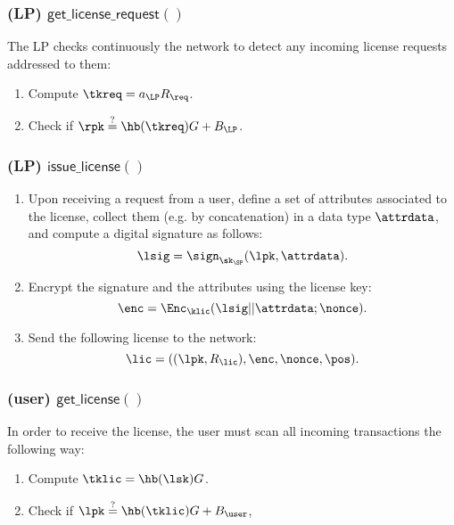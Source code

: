 \subsubsection{(\textbf{LP}) $\mathsf{get\_license\_request()}$}

The LP checks continuously the network to detect any incoming license requests addressed to them:

\begin{enumerate}
	\item Compute $\tkreq = a_{\LP}R_{\req}$.
	\item Check if $\rpk \stackrel{?}{=} \hb(\tkreq) G + B_{\LP}$.
\end{enumerate}


\subsubsection{(\textbf{LP}) $\mathsf{issue\_license()}$}


\begin{enumerate}
	\item Upon receiving a request from a user, define a set of attributes associated to the license, collect them (e.g. by concatenation) in a data type $\attrdata$, and compute a digital signature as follows:
	$$\lsig = \sign_{\sk_{\SP}}(\lpk, \attrdata).$$
	\item Encrypt the signature and the attributes using the license key:
	$$\enc = \Enc_{\klic} (\lsig || \attrdata; \nonce).$$
	\item Send the following license to the network:
	$$\lic = ((\lpk, R_{\lic}), \enc, \nonce, \pos).$$
\end{enumerate}

\subsubsection{(\textbf{user}) $\mathsf{get\_license()}$}

In order to receive the license, the user must scan all incoming transactions the following way:

\begin{enumerate}
	\item Compute $\tklic = \hb(\lsk)G$.
	\item Check if $\lpk \stackrel{?}{=} \hb(\tklic) G + B_{\user}$, 
\end{enumerate}	

